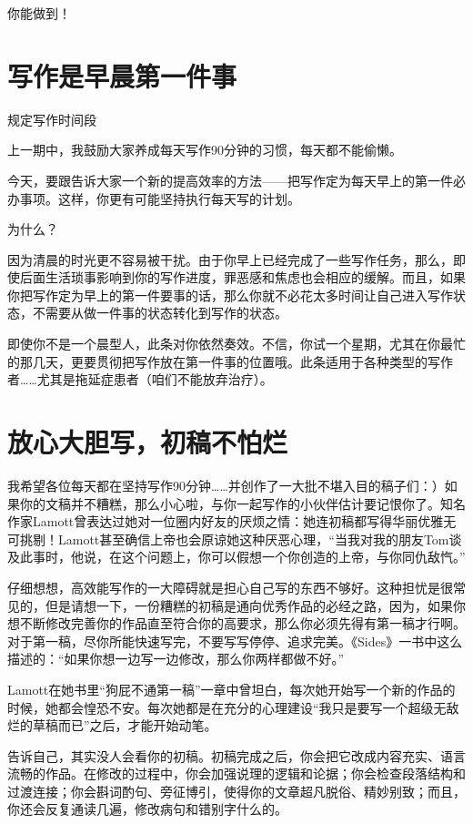 \documentclass{ctexart}
\begin{document}
你能做到！

\section{写作是早晨第一件事}

规定写作时间段

上一期中，我鼓励大家养成每天写作90分钟的习惯，每天都不能偷懒。

今天，要跟告诉大家一个新的提高效率的方法——把写作定为每天早上的第一件必办事项。这样，你更有可能坚持执行每天写的计划。

为什么？

因为清晨的时光更不容易被干扰。由于你早上已经完成了一些写作任务，那么，即使后面生活琐事影响到你的写作进度，罪恶感和焦虑也会相应的缓解。而且，如果你把写作定为早上的第一件要事的话，那么你就不必花太多时间让自己进入写作状态，不需要从做一件事的状态转化到写作的状态。

即使你不是一个晨型人，此条对你依然奏效。不信，你试一个星期，尤其在你最忙的那几天，更要贯彻把写作放在第一件事的位置哦。此条适用于各种类型的写作者……尤其是拖延症患者（咱们不能放弃治疗）。

\section{放心大胆写，初稿不怕烂}

我希望各位每天都在坚持写作90分钟……并创作了一大批不堪入目的稿子们：）如果你的文稿并不糟糕，那么小心啦，与你一起写作的小伙伴估计要记恨你了。知名作家Lamott曾表达过她对一位圈内好友的厌烦之情：她连初稿都写得华丽优雅无可挑剔！Lamott甚至确信上帝也会原谅她这种厌恶心理，“当我对我的朋友Tom谈及此事时，他说，在这个问题上，你可以假想一个你创造的上帝，与你同仇敌忾。”

仔细想想，高效能写作的一大障碍就是担心自己写的东西不够好。这种担忧是很常见的，但是请想一下，一份糟糕的初稿是通向优秀作品的必经之路，因为，如果你想不断修改完善你的作品直至符合你的高要求，那么你必须先得有第一稿才行啊。对于第一稿，尽你所能快速写完，不要写写停停、追求完美。《Sides》一书中这么描述的：“如果你想一边写一边修改，那么你两样都做不好。”

Lamott在她书里“狗屁不通第一稿”一章中曾坦白，每次她开始写一个新的作品的时候，她都会惶恐不安。每次她都是在充分的心理建设“我只是要写一个超级无敌烂的草稿而已”之后，才能开始动笔。

告诉自己，其实没人会看你的初稿。初稿完成之后，你会把它改成内容充实、语言流畅的作品。在修改的过程中，你会加强说理的逻辑和论据；你会检查段落结构和过渡连接；你会斟词酌句、旁征博引，使得你的文章超凡脱俗、精妙别致；而且，你还会反复通读几遍，修改病句和错别字什么的。
\end{document}
